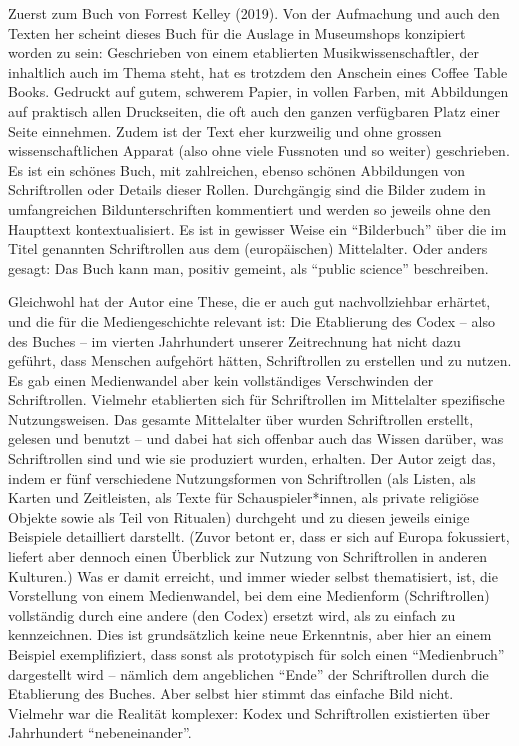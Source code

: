 \documentclass[a4paper,
fontsize=11pt,
oneside,
numbers=noperiodatend,
parskip=half-,
bibliography=totoc,
final
]{scrartcl}
\begin{document}
Zuerst zum Buch von Forrest Kelley (2019). Von der Aufmachung und auch
den Texten her scheint dieses Buch für die Auslage in Museumshops
konzipiert worden zu sein: Geschrieben von einem etablierten
Musikwissenschaftler, der inhaltlich auch im Thema steht, hat es
trotzdem den Anschein eines Coffee Table Books. Gedruckt auf gutem,
schwerem Papier, in vollen Farben, mit Abbildungen auf praktisch allen
Druckseiten, die oft auch den ganzen verfügbaren Platz einer Seite
einnehmen. Zudem ist der Text eher kurzweilig und ohne grossen
wissenschaftlichen Apparat (also ohne viele Fussnoten und so weiter)
geschrieben. Es ist ein schönes Buch, mit zahlreichen, ebenso schönen
Abbildungen von Schriftrollen oder Details dieser Rollen. Durchgängig
sind die Bilder zudem in umfangreichen Bildunterschriften kommentiert
und werden so jeweils ohne den Haupttext kontextualisiert. Es ist in
gewisser Weise ein \enquote{Bilderbuch} über die im Titel genannten
Schriftrollen aus dem (europäischen) Mittelalter. Oder anders gesagt:
Das Buch kann man, positiv gemeint, als \enquote{public science}
beschreiben.

Gleichwohl hat der Autor eine These, die er auch gut nachvollziehbar
erhärtet, und die für die Mediengeschichte relevant ist: Die Etablierung
des Codex -- also des Buches -- im vierten Jahrhundert unserer
Zeitrechnung hat nicht dazu geführt, dass Menschen aufgehört hätten,
Schriftrollen zu erstellen und zu nutzen. Es gab einen Medienwandel aber
kein vollständiges Verschwinden der Schriftrollen. Vielmehr etablierten
sich für Schriftrollen im Mittelalter spezifische Nutzungsweisen. Das
gesamte Mittelalter über wurden Schriftrollen erstellt, gelesen und
benutzt -- und dabei hat sich offenbar auch das Wissen darüber, was
Schriftrollen sind und wie sie produziert wurden, erhalten. Der Autor
zeigt das, indem er fünf verschiedene Nutzungsformen von Schriftrollen
(als Listen, als Karten und Zeitleisten, als Texte für
Schauspieler*innen, als private religiöse Objekte sowie als Teil von
Ritualen) durchgeht und zu diesen jeweils einige Beispiele detailliert
darstellt. (Zuvor betont er, dass er sich auf Europa fokussiert, liefert
aber dennoch einen Überblick zur Nutzung von Schriftrollen in anderen
Kulturen.) Was er damit erreicht, und immer wieder selbst thematisiert,
ist, die Vorstellung von einem Medienwandel, bei dem eine Medienform
(Schriftrollen) vollständig durch eine andere (den Codex) ersetzt wird,
als zu einfach zu kennzeichnen. Dies ist grundsätzlich keine neue
Erkenntnis, aber hier an einem Beispiel exemplifiziert, dass sonst als
prototypisch für solch einen \enquote{Medienbruch} dargestellt wird --
nämlich dem angeblichen \enquote{Ende} der Schriftrollen durch die
Etablierung des Buches. Aber selbst hier stimmt das einfache Bild nicht.
Vielmehr war die Realität komplexer: Kodex und Schriftrollen existierten
über Jahrhundert \enquote{nebeneinander}.
\end{document}
